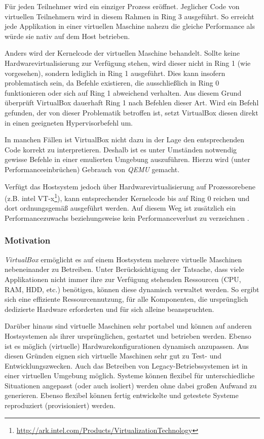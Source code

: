 Für jeden Teilnehmer wird ein einziger Prozess eröffnet. Jeglicher Code von virtuellen Teilnehmern
wird in diesem Rahmen in Ring 3 ausgeführt. So erreicht jede Applikation in einer virtuellen Maschine
nahezu die gleiche Performance als würde sie nativ auf dem Host betrieben.

Anders wird der Kernelcode der virtuellen Maschine behandelt. Sollte keine Hardwarevirtualisierung
zur Verfügung stehen, wird dieser nicht in Ring 1 (wie vorgesehen), sondern lediglich in Ring 1
ausgeführt. Dies kann insofern problematisch sein, da Befehle existieren, die ausschließlich
in Ring 0 funktionieren oder sich auf Ring 1 abweichend verhalten. Aus diesem Grund überprüft
VirtualBox dauerhaft Ring 1 nach Befehlen dieser Art. Wird ein Befehl gefunden, der von dieser
Problematik betroffen ist, setzt VirtualBox diesen direkt in einen geeigneten Hypervisorbefehl
um.

In manchen Fällen ist VirtualBox nicht dazu in der Lage den entsprechenden Code korrekt zu
interpretieren. Deshalb ist es unter Umständen notwendig gewisse Befehle in einer
emulierten Umgebung auszuführen. Hierzu wird (unter Performanceeinbrüchen) Gebrauch von
\textit{QEMU} gemacht. 

Verfügt das Hostsystem jedoch über Hardwarevirtualisierung auf Prozessorebene 
(z.B. intel VT-x\footnote{\url{http://ark.intel.com/Products/VirtualizationTechnology}}),
kann entsprechender Kernelcode bis auf Ring 0 reichen und dort ordnungsgemäß ausgeführt werden.
Auf diesem Weg ist zusätzlich
ein Performancezuwachs beziehungsweise kein Performanceverlust zu verzeichnen \cite{victor10}.

\subsubsection{Motivation}
\textit{VirtualBox} ermöglicht es auf einem Hostsystem mehrere virtuelle Maschinen nebeneinander
zu Betreiben. Unter Berücksichtigung der Tatsache, dass viele Applikationen nicht immer ihre
zur Verfügung stehenden Ressourcen (CPU, RAM, HDD, etc.) benötigen, können diese dynamisch verwaltet
werden. So ergibt sich eine effiziente Ressourcennutzung, für alle Komponenten, die ursprünglich
dedizierte Hardware erforderten und für sich alleine beanspruchten.

Darüber hinaus sind virtuelle Maschinen sehr portabel und können auf anderen Hostsystemen als
ihrer ursprünglichen, gestartet und betrieben werden. Ebenso ist es möglich (virtuelle)
Hardwarekonfigurationen dynamisch anzupassen. Aus diesen Gründen eignen sich virtuelle
Maschinen sehr gut zu Test- und Entwicklungszwecken. Auch das Betreiben von Legacy-Betriebssystemen
ist in einer virtuellen Umgebung möglich. Systeme können flexibel für unterschiedliche
Situationen angepasst (oder auch isoliert) werden ohne dabei großen Aufwand zu generieren.
Ebenso flexibel können fertig entwickelte und getestete Systeme reproduziert (provisioniert) werden.

